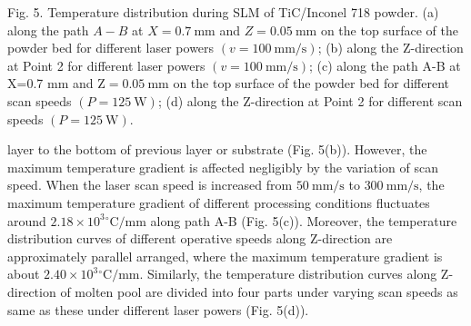 \documentclass[10pt]{article}
\begin{document}
Fig. 5. Temperature distribution during SLM of TiC/Inconel 718 powder. (a) along the path $A-B$ at $X=0.7 \mathrm{~mm}$ and $Z=0.05 \mathrm{~mm}$ on the top surface of the powder bed for different laser powers $(v=100 \mathrm{~mm} / \mathrm{s})$; (b) along the Z-direction at Point 2 for different laser powers $(v=100 \mathrm{~mm} / \mathrm{s})$; (c) along the path A-B at X=0.7 $\mathrm{mm}$ and $\mathrm{Z}=0.05 \mathrm{~mm}$ on the top surface of the powder bed for different scan speeds $(P=125 \mathrm{~W})$; (d) along the Z-direction at Point 2 for different scan speeds $(P=125 \mathrm{~W})$.

layer to the bottom of previous layer or substrate (Fig. 5(b)). However, the maximum temperature gradient is affected negligibly by the variation of scan speed. When the laser scan speed is increased from $50 \mathrm{~mm} / \mathrm{s}$ to $300 \mathrm{~mm} / \mathrm{s}$, the maximum temperature gradient of different processing conditions fluctuates around $2.18 \times 10^{3}{ }^{\circ} \mathrm{C} / \mathrm{mm}$ along path A-B (Fig. 5(c)). Moreover, the temperature distribution curves of different operative speeds along Z-direction are approximately parallel arranged, where the maximum temperature gradient is about $2.40 \times 10^{3}{ }^{\circ} \mathrm{C} / \mathrm{mm}$. Similarly, the temperature distribution curves along Z-direction of molten pool are divided into four parts under varying scan speeds as same as these under different laser powers (Fig. 5(d)).
\end{document}
